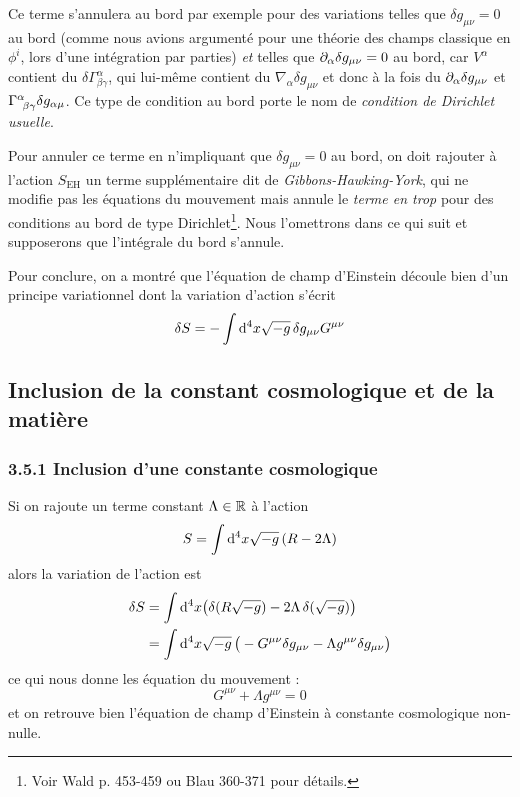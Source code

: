 \begin{rmk}
    Ce terme s'annulera au bord par exemple pour des variations telles que $\delta g_{\mu\nu} = 0$ au bord (comme nous avions argumenté pour une théorie des champs classique en $\phi^i$, lors d'une intégration par parties) \emph{et} telles que $\partial_\alpha \delta g_{\mu\nu} = 0$ au bord, car $V^\alpha$ contient du $\delta \Gamma^\alpha_{\beta\gamma}$, qui lui-même contient du $\nabla_\alpha \delta g_{\mu\nu}$ et donc à la fois du $\partial_\alpha \delta g_{\mu\nu}$ et $\Gamma\indices{^\alpha_{\!\beta \gamma}}\delta g_{\alpha \mu}$. Ce type de condition au bord porte le nom de \emph{condition de Dirichlet usuelle}.
    
    Pour annuler ce terme en n'impliquant que $\delta g_{\mu\nu} = 0$ au bord, on doit rajouter à l'action $S_\text{EH}$ un terme supplémentaire dit de \emph{Gibbons-Hawking-York}, qui ne modifie pas les équations du mouvement mais annule le \emph{terme en trop} pour des conditions au bord de type Dirichlet\footnote{Voir Wald p. 453-459 ou Blau 360-371 pour détails.}. Nous l'omettrons dans ce qui suit et supposerons que l'intégrale du bord s'annule.
\end{rmk}
\cutebreak
Pour conclure, on a montré que l'équation de champ d'Einstein découle bien d'un principe variationnel dont la variation d'action s'écrit
\begin{equation}
    \delta S = -\int \mathrm{d}^4 x \sqrt{-g}\,\delta g_{\mu \nu}G^{\mu \nu}
\end{equation}
\subsection{Inclusion de la constant cosmologique et de la matière}

\subsubsection{3.5.1 Inclusion d'une constante cosmologique}
Si on rajoute un terme constant $\Lambda \in \mathbb{R}$ à l'action
\begin{equation}
    S = \int \mathrm{d} ^4x \sqrt{-g}\,(R - 2\Lambda)
\end{equation}
alors la variation de l'action est
\begin{align}
    \delta S &= \int \mathrm{d}^4 x \big(\delta (R \sqrt{-g}) -2  \Lambda\, \delta (\sqrt{-g})\big)\\
    &= \int \mathrm{d}^4 x \sqrt{-g} \,\big(-G^{\mu \nu} \delta g_{\mu \nu} - \Lambda  g^{\mu \nu}\delta g_{\mu \nu}\big)
\end{align}
ce qui nous donne les équation du mouvement :
\begin{equation}
   G^{\mu \nu} + \Lambda g^{\mu \nu} = 0
\end{equation}
et on retrouve bien l'équation de champ d'Einstein à constante cosmologique non-nulle.
